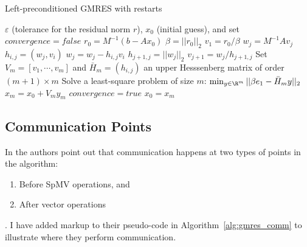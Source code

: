 \begin{algorithm}                      %
\caption{Left-preconditioned GMRES with restarts}          %
\label{alg:gmres}                           %
\begin{algorithmic}[1]                    %
    \State $\varepsilon$ (tolerance for the residual norm $r$), $x_0$ (initial guess), and set $convergence = false$
    \State $r_0 = M^{-1} (b-Ax_0)$ 
    \State $\beta = ||r_0||_2$
    \State $v_1 = r_0 / \beta$ 
	 \label{alg:gmres_rotation_loop_start} 
			\State $w_j = M^{-1} A v_j$
			\label{alg:gmres_inner_loop_start}  
				\State $h_{i,j} = (w_j, v_i)$ 
				\State $w_j = w_j - h_{i,j} v_i$
			\EndFor \label{alg:gmres_inner_loop_stop}
			\State $h_{j+1, j}  = ||w_j||_2$			
			\State $v_{j+1} = w_j / h_{j+1,j}$		
	\EndFor\label{alg:gmres_rotation_loop_stop} 
	\State Set $V_m = [v_1, \cdots, v_m]$ and $\bar{H}_m = (h_{i,j})$ an upper Hesssenberg matrix of order $(m+1)\times m$
	\State \label{alg:gmres_least_squares} Solve a least-square problem of size $m$: $\min_{y \in \R^m} ||\beta e_1 - \bar{H}_m y||_2$	
	\State $x_m = x_0 + V_m y_m$ \label{alg:gmres_residual_norm}
		\State $convergence = true$
	\EndIf
	\State $x_0 = x_m$
    \EndWhile
\end{algorithmic}
\end{algorithm}

\subsection{Communication Points} 

In \cite{Bahi2011} the authors point out that communication happens at two types of points in the algorithm: \begin{enumerate} \item Before SpMV operations, and \item After vector operations \end{enumerate}. I have added markup to their pseudo-code in Algorithm~\ref{alg:gmres_comm} to illustrate where they perform communication. 

